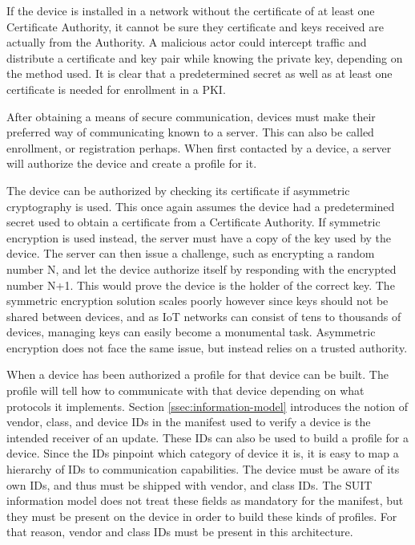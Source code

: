 \documentclass[0-thesis.tex]{subfiles}
\begin{document}
If the device is installed in a network without the certificate of at least one
Certificate Authority, it cannot be sure they certificate and keys received are actually
from the Authority. A malicious actor could intercept traffic and distribute a certificate
and key pair while knowing the private key, depending on the method used. It is clear that
a predetermined secret as well as at least one certificate is needed for enrollment in a
PKI.

After obtaining a means of secure communication, devices must make their preferred way of
communicating known to a server. This can also be called enrollment, or registration
perhaps. When first contacted by a device, a server will authorize the device and create a
profile for it.

The device can be authorized by checking its certificate if asymmetric cryptography is
used. This once again assumes the device had a predetermined secret used to obtain a
certificate from a Certificate Authority. If symmetric encryption is used instead, the
server must have a copy of the key used by the device. The server can then issue a
challenge, such as encrypting a random number N, and let the device authorize itself by
responding with the encrypted number N+1. This would prove the device is the holder of the
correct key. The symmetric encryption solution scales poorly however since keys should not
be shared between devices, and as IoT networks can consist of tens to thousands of
devices, managing keys can easily become a monumental task. Asymmetric encryption does not
face the same issue, but instead relies on a trusted authority.

When a device has been authorized a profile for that device can be built. The profile will
tell how to communicate with that device depending on what protocols it implements.
Section \ref{ssec:information-model} introduces the notion of vendor, class, and device
IDs in the manifest used to verify a device is the intended receiver of an update. These
IDs can also be used to build a profile for a device. Since the IDs pinpoint which
category of device it is, it is easy to map a hierarchy of IDs to communication
capabilities. The device must be aware of its own IDs, and thus must be shipped with
vendor, and class IDs. The SUIT information model does not treat these fields as mandatory
for the manifest, but they must be present on the device in order to build these kinds of
profiles. For that reason, vendor and class IDs must be present in this architecture.
\end{document}
